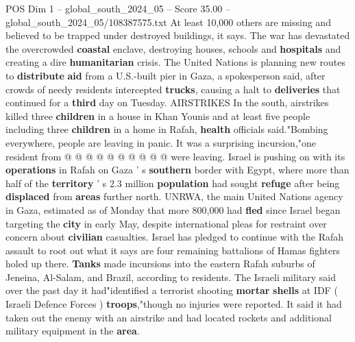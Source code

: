 \begin{textsample}{POS Dim 1 – global\_south\_2024\_05 – Score 35.00 – global\_south\_2024\_05/108387575.txt}
At least 10,000 others are missing and believed to be trapped under destroyed buildings, it says.
The war has devastated the overcrowded \textbf{coastal} enclave, destroying houses, schools and \textbf{hospitals} and creating a dire \textbf{humanitarian} crisis.
The United Nations is planning new routes to \textbf{distribute} \textbf{aid} from a U.S.-built pier in Gaza, a spokesperson said, after crowds of needy residents intercepted \textbf{trucks}, causing a halt to \textbf{deliveries} that continued for a \textbf{third} day on Tuesday.
AIRSTRIKES In the south, airstrikes killed three \textbf{children} in a house in Khan Younis and at least five people including three \textbf{children} in a home in Rafah, \textbf{health} officials said."Bombing everywhere, people are leaving in panic.
It was a surprising incursion,"one resident from @ @ @ @ @ @ @ @ @ @ were leaving.
Israel is pushing on with its \textbf{operations} in Rafah on Gaza ' s \textbf{southern} border with Egypt, where more than half of the \textbf{territory} ' s 2.3 million \textbf{population} had sought \textbf{refuge} after being \textbf{displaced} from \textbf{areas} further north.
UNRWA, the main United Nations agency in Gaza, estimated as of Monday that more 800,000 had \textbf{fled} since Israel began targeting the \textbf{city} in early May, despite international pleas for restraint over concern about \textbf{civilian} casualties.
Israel has pledged to continue with the Rafah assault to root out what it says are four remaining battalions of Hamas fighters holed up there. \textbf{Tanks} made incursions into the eastern Rafah suburbs of Jeneina, Al-Salam, and Brazil, according to residents.
The Israeli military said over the past day it had"identified a terrorist shooting \textbf{mortar} \textbf{shells} at IDF ( Israeli Defence Forces ) \textbf{troops},"though no injuries were reported.
It said it had taken out the enemy with an airstrike and had located rockets and additional military equipment in the \textbf{area}.

\end{textsample}
